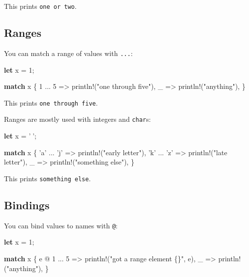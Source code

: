 \documentclass[a4paper,]{book}
\newenvironment{Shaded}{\begin{snugshade}}{\end{snugshade}}
\newcommand{\KeywordTok}[1]{\textcolor[rgb]{0.13,0.29,0.53}{\textbf{{#1}}}}
\newcommand{\DecValTok}[1]{\textcolor[rgb]{0.00,0.00,0.81}{{#1}}}
\newcommand{\CharTok}[1]{\textcolor[rgb]{0.31,0.60,0.02}{{#1}}}
\newcommand{\StringTok}[1]{\textcolor[rgb]{0.31,0.60,0.02}{{#1}}}
\newcommand{\OtherTok}[1]{\textcolor[rgb]{0.56,0.35,0.01}{{#1}}}
\newcommand{\NormalTok}[1]{{#1}}
\begin{document}
This prints \texttt{one\ or\ two}.

\subsection{Ranges}\label{ranges}

You can match a range of values with \texttt{...}:

\begin{Shaded}
\begin{Highlighting}[]
\KeywordTok{let} \NormalTok{x = }\DecValTok{1}\NormalTok{;}

\KeywordTok{match} \NormalTok{x \{}
    \DecValTok{1} \NormalTok{... }\DecValTok{5} \NormalTok{=> }\OtherTok{println!}\NormalTok{(}\StringTok{"one through five"}\NormalTok{),}
    \NormalTok{_ => }\OtherTok{println!}\NormalTok{(}\StringTok{"anything"}\NormalTok{),}
\NormalTok{\}}
\end{Highlighting}
\end{Shaded}

This prints \texttt{one\ through\ five}.

Ranges are mostly used with integers and \texttt{char}s:

\begin{Shaded}
\begin{Highlighting}[]
\KeywordTok{let} \NormalTok{x = }\CharTok{'💅'}\NormalTok{;}

\KeywordTok{match} \NormalTok{x \{}
    \CharTok{'a'} \NormalTok{... }\CharTok{'j'} \NormalTok{=> }\OtherTok{println!}\NormalTok{(}\StringTok{"early letter"}\NormalTok{),}
    \CharTok{'k'} \NormalTok{... }\CharTok{'z'} \NormalTok{=> }\OtherTok{println!}\NormalTok{(}\StringTok{"late letter"}\NormalTok{),}
    \NormalTok{_ => }\OtherTok{println!}\NormalTok{(}\StringTok{"something else"}\NormalTok{),}
\NormalTok{\}}
\end{Highlighting}
\end{Shaded}

This prints \texttt{something\ else}.

\subsection{Bindings}\label{bindings}

You can bind values to names with \texttt{@}:

\begin{Shaded}
\begin{Highlighting}[]
\KeywordTok{let} \NormalTok{x = }\DecValTok{1}\NormalTok{;}

\KeywordTok{match} \NormalTok{x \{}
    \NormalTok{e @ }\DecValTok{1} \NormalTok{... }\DecValTok{5} \NormalTok{=> }\OtherTok{println!}\NormalTok{(}\StringTok{"got a range element \{\}"}\NormalTok{, e),}
    \NormalTok{_ => }\OtherTok{println!}\NormalTok{(}\StringTok{"anything"}\NormalTok{),}
\NormalTok{\}}
\end{Highlighting}
\end{Shaded}
\end{document}
